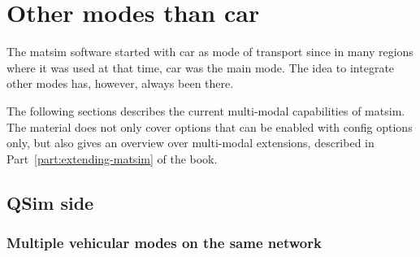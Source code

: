 \section{Other modes than car}



The \gls{matsim} software started with car as mode of transport since in many regions where it was used at that time, car was the main mode.  The idea to integrate other modes has, however, always been there.

The following sections describes the current multi-modal capabilities of \gls{matsim}.  The material does not only cover options that can be enabled with config options only, but also gives an overview over multi-modal extensions, described in Part~\ref{part:extending-matsim} of the book.

\subsection{QSim side}

\subsubsection{Multiple vehicular modes on the same network}



